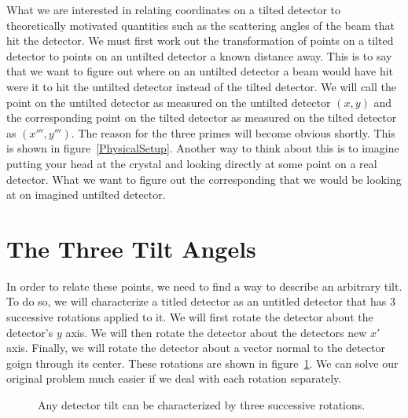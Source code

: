 What we are interested in relating
coordinates on a tilted detector 
to theoretically motivated quantities such as 
the scattering angles of the beam that hit the
detector. We must first work
out the transformation of points on a tilted detector
to points on an untilted detector a known distance
away. This is to say
that we want to figure out where on an untilted 
detector a beam would have hit were it to hit
the untilted detector instead of the tilted detector.
We will call the point on the untilted detector
as measured on the untilted detector $(x,y)$ 
and the corresponding point on the tilted detector
as measured on the tilted detector as $(x''',y''')$. 
The reason for the three primes will become obvious
shortly. This is shown in 
figure~\ref{PhysicalSetup}. Another way to think
about this is to imagine putting your 
head at the crystal and looking directly 
at some point on a real
detector. What we want to figure out
the corresponding that we would be looking
at on imagined untilted detector.

\begin{SCfigure}[1][htbp]
    \centering
    
    \caption{Here, the detector 
    is titled with respect to the 
    incoming beam. We will call a point on 
    the tilted detector $(x''',y''')$. We are interested in 
    relating this point to the point $(x,y)$ on an imagined 
    untilted detector.}
    \label{PhysicalSetup}
\end{SCfigure}

\section{The Three Tilt Angels}
\index{$\alpha$} \index{$\beta$}  
In order to relate these points, we need to find a way to 
describe an arbitrary tilt. To do so, we will 
characterize a titled detector as an untitled detector
that has 3 successive rotations applied to it. 
We will first rotate the detector about the detector's $y$
axis. We will then rotate the detector about the detectors
new $x'$ axis. Finally, we will rotate the detector about
a vector normal to the detector goign through its center.
These rotations are shown in figure~\ref{ThreeTilts}.
We can solve our original problem much easier if we deal
with each rotation separately.

\begin{figure}[htb]
    \centering
    \;\;
    \;\;
    \caption{Any detector tilt can be characterized 
    by three successive rotations.}
    \label{ThreeTilts}
\end{figure}

